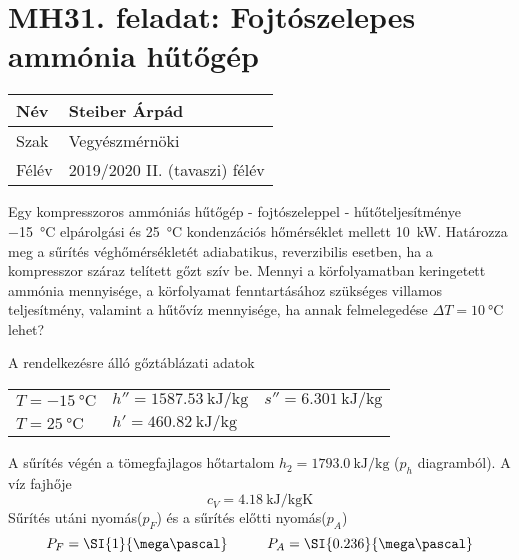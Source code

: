 

\section*{MH31. feladat: Fojtószelepes ammónia hűtőgép}


\begin{tabular}{ | p{2cm} | p{14cm} | } 
	\hline
	Név & Steiber Árpád \\ 
	\hline
	Szak & Vegyészmérnöki \\ 
	\hline
	Félév & 2019/2020 II. (tavaszi) félév \\ 
	\hline
\end{tabular}
\vspace{0.5cm}

\noindent Egy kompresszoros ammóniás hűtőgép - fojtószeleppel - hűtőteljesítménye \SI{-15}{\celsius} elpárolgási és \SI{25}{\celsius} kondenzációs hőmérséklet mellett  \SI{10}{\kilo\watt}. Határozza meg a sűrítés véghőmérsékletét adiabatikus, reverzibilis esetben, ha a kompresszor száraz telített gőzt szív be. Mennyi a körfolyamatban keringetett ammónia mennyisége, a körfolyamat fenntartásához szükséges villamos teljesítmény, valamint a hűtővíz mennyisége, ha annak felmelegedése 
$\Delta T = \SI{10}{\celsius}$ lehet?

\vspace{0.5cm}
\noindent A rendelkezésre álló gőztáblázati adatok
\vspace{0.2cm}
\begin{center}
\begin{tabular}{p{5cm} p{5cm} p{5cm}}
	$T = \SI{-15}{\celsius}$ &
	$h''=\SI{1587.53}{\kilo\joule\per\kilo\gram}$ & 
	$s''= \SI{6.301}{\kilo\joule\per\kilo\gram}$ \\ 
	$T = \SI{25}{\celsius}$ &
	$h'=\SI{460.82}{\kilo\joule\per\kilo\gram}$ 	
\end{tabular}
\end{center}
\noindent A sűrítés végén a tömegfajlagos hőtartalom $h_2=\SI{1793.0}{\kilo\joule\per\kilo\gram}$ ($p_h$ diagramból). 
A víz fajhője
\begin{equation}
c_V=\SI{4.18}{\kilo\joule\per\kilo\gram\kelvin}
\end{equation}	
Sűrítés utáni nyomás($p_F$) és a sűrítés előtti nyomás($p_A$)
\begin{equation}
P_F=\SI{1}{\mega\pascal} \hspace{1 cm}
P_A=\SI{0.236}{\mega\pascal}
\end{equation}

